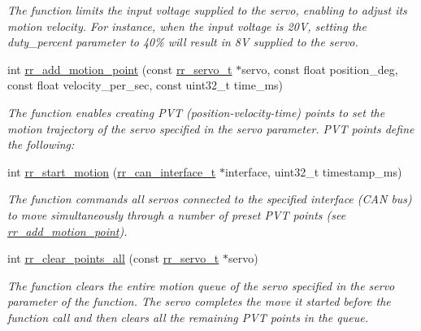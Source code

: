 \begin{DoxyCompactItemize}
\begin{DoxyCompactList}\small\item\em The function limits the input voltage supplied to the servo, enabling to adjust its motion velocity. For instance, when the input voltage is 20V, setting the duty\+\_\+percent parameter to 40\% will result in 8V supplied to the servo. \end{DoxyCompactList}\item 
int \hyperlink{group___servo__control_gac8f66751d1047a4d067e3ff5b388a7f9}{rr\+\_\+add\+\_\+motion\+\_\+point} (const \hyperlink{structrr__servo__t}{rr\+\_\+servo\+\_\+t} $\ast$servo, const float position\+\_\+deg, const float velocity\+\_\+per\+\_\+sec, const uint32\+\_\+t time\+\_\+ms)
\begin{DoxyCompactList}\small\item\em The function enables creating P\+VT (position-\/velocity-\/time) points to set the motion trajectory of the servo specified in the \textquotesingle{}servo\textquotesingle{} parameter. P\+VT points define the following\+:~\newline
 \end{DoxyCompactList}\item 
int \hyperlink{group___servo__control_gaeb3f167be0e7caf96d4cb4b648d3a548}{rr\+\_\+start\+\_\+motion} (\hyperlink{structrr__can__interface__t}{rr\+\_\+can\+\_\+interface\+\_\+t} $\ast$interface, uint32\+\_\+t timestamp\+\_\+ms)
\begin{DoxyCompactList}\small\item\em The function commands all servos connected to the specified interface (C\+AN bus) to move simultaneously through a number of preset P\+VT points (see \hyperlink{group___servo__control_gac8f66751d1047a4d067e3ff5b388a7f9}{rr\+\_\+add\+\_\+motion\+\_\+point}).~\newline
 \end{DoxyCompactList}\item 
int \hyperlink{group___servo__control_ga19472cd90ae91f9b9f49edf4f52f35a2}{rr\+\_\+clear\+\_\+points\+\_\+all} (const \hyperlink{structrr__servo__t}{rr\+\_\+servo\+\_\+t} $\ast$servo)
\begin{DoxyCompactList}\small\item\em The function clears the entire motion queue of the servo specified in the \textquotesingle{}servo\textquotesingle{} parameter of the function. The servo completes the move it started before the function call and then clears all the remaining P\+VT points in the queue. \end{DoxyCompactList}\item 

\end{DoxyCompactItemize}
